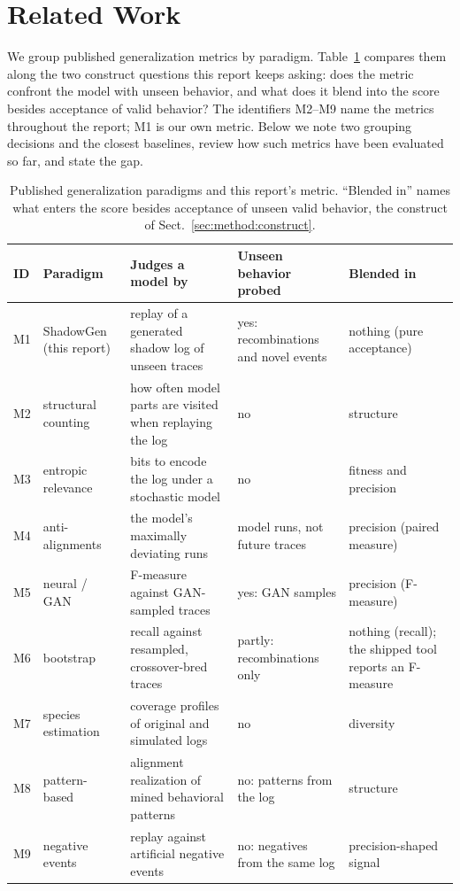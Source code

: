 \documentclass[runningheads]{llncs}
\begin{document}
\section{Related Work}
\label{sec:related}

We group published generalization metrics by paradigm. Table~\ref{tab:paradigms} compares them along the two construct questions this report keeps asking: does the metric confront the model with unseen behavior, and what does it blend into the score besides acceptance of valid behavior? The identifiers M2--M9 name the metrics throughout the report; M1 is our own metric. Below we note two grouping decisions and the closest baselines, review how such metrics have been evaluated so far, and state the gap.

\begin{table}[!ht]
\centering
\caption{Published generalization paradigms and this report's metric. ``Blended in'' names what enters the score besides acceptance of unseen valid behavior, the construct of Sect.~\ref{sec:method:construct}.}
\label{tab:paradigms}
\setlength{\tabcolsep}{2.5pt}
\scriptsize
\begin{tabular}{@{}l p{2.25cm} p{3.85cm} p{2.45cm} p{2.45cm}@{}}
\toprule
ID & Paradigm & Judges a model by & Unseen behavior probed & Blended in \\
\midrule
M1 & ShadowGen (this report) & replay of a generated shadow log of unseen traces & yes: recombinations and novel events & nothing (pure acceptance) \\
M2 & structural counting~\cite{buijs2014quality,berti2019pm4py} & how often model parts are visited when replaying the log & no & structure \\
M3 & entropic relevance~\cite{alkhammash2022entropic} & bits to encode the log under a stochastic model & no & fitness and precision \\
M4 & anti-alignments~\cite{vandongen2016anti} & the model's maximally deviating runs & model runs, not future traces & precision (paired measure) \\
M5 & neural / GAN~\cite{theis2020avatar} & F-measure against GAN-sampled traces & yes: GAN samples & precision (F-measure) \\
M6 & bootstrap~\cite{polyvyanyy2022bootstrap} & recall against resampled, crossover-bred traces & partly: recombinations only & nothing (recall); the shipped tool reports an F-measure \\
M7 & species estimation~\cite{kabierski2023species} & coverage profiles of original and simulated logs & no & diversity \\
M8 & pattern-based~\cite{reissner2022pattern} & alignment realization of mined behavioral patterns & no: patterns from the log & structure \\
M9 & negative events~\cite{vandenbroucke2014negative} & replay against artificial negative events & no: negatives from the same log & precision-shaped signal \\
\bottomrule
\end{tabular}
\end{table}
\end{document}
